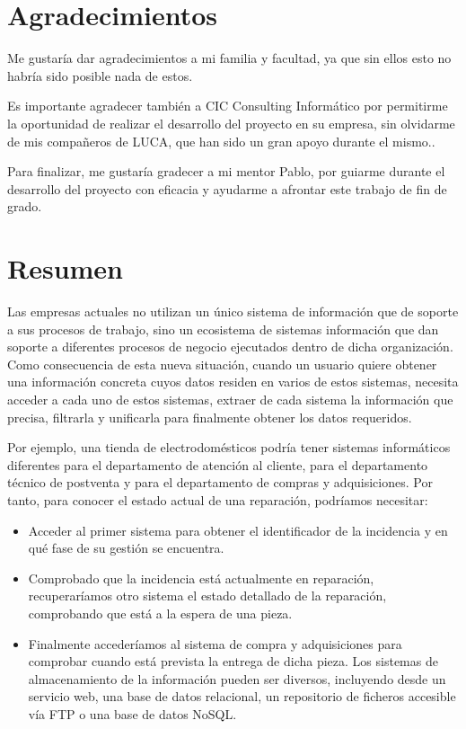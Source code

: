 \chapter*{Agradecimientos}
	Me gustaría dar agradecimientos a mi familia y facultad, ya que sin ellos esto no habría sido posible nada de estos.
	
	 Es importante agradecer también a CIC Consulting Informático por permitirme la oportunidad de realizar el desarrollo del proyecto en su empresa, sin olvidarme de mis compañeros de LUCA, que han sido un gran apoyo durante el mismo..
	
	 Para finalizar, me gustaría gradecer a mi mentor Pablo, por guiarme durante el desarrollo del proyecto con eficacia y ayudarme a afrontar este trabajo de fin de grado.

	
	\chapter*{Resumen}
	Las empresas actuales no utilizan un único sistema de información que de soporte a sus procesos de trabajo, sino un  ecosistema de sistemas información que dan soporte a diferentes procesos de negocio ejecutados dentro de dicha organización. Como consecuencia de esta nueva situación, cuando un usuario	quiere obtener una información concreta cuyos datos residen en varios de estos
	sistemas, necesita acceder a cada uno de estos sistemas, extraer de cada sistema la información que precisa, filtrarla y unificarla para finalmente	obtener los datos requeridos.
	
	
	Por ejemplo, una tienda de electrodomésticos podría tener sistemas informáticos diferentes para el departamento de atención al cliente, para el departamento técnico de postventa y para el departamento de compras y adquisiciones. Por tanto, para conocer el estado actual de una reparación, podríamos necesitar:
		\begin{itemize}
			\item  Acceder al primer sistema para obtener el identificador de la incidencia y en qué fase de su gestión se encuentra.
			\item  Comprobado que la incidencia está actualmente en reparación, recuperaríamos otro sistema el estado detallado de la reparación, comprobando que está a la espera de una pieza.
			\item Finalmente accederíamos al sistema de compra y adquisiciones para comprobar cuando está prevista la entrega de dicha pieza. Los sistemas de almacenamiento de la información pueden ser diversos, incluyendo desde un servicio web, una base de datos relacional, un repositorio de ficheros accesible vía FTP o una base de datos NoSQL.
		\end{itemize}
	

